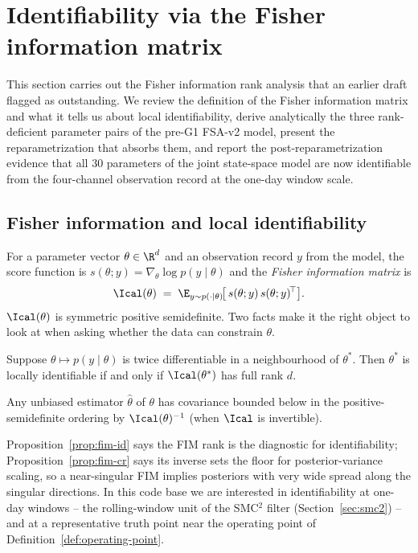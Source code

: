\section{Identifiability via the Fisher information matrix}\label{sec:fim}

This section carries out the Fisher information rank analysis that an
earlier draft flagged as outstanding. We review the definition of the
Fisher information matrix and what it tells us about local
identifiability, derive analytically the three rank-deficient parameter
pairs of the pre-G1 FSA-v2 model, present the reparametrization that
absorbs them, and report the post-reparametrization evidence that all
$30$ parameters of the joint state-space model are now identifiable
from the four-channel observation record at the one-day window scale.

\subsection{Fisher information and local identifiability}

For a parameter vector $\theta \in \R^d$ and an observation record
$y$ from the model, the score function is
$s(\theta;y) = \nabla_\theta \log p(y\mid\theta)$ and the
\emph{Fisher information matrix} is
\begin{equation}
  \Ical(\theta) \;=\;
    \E_{y \sim p(\cdot\mid\theta)}\!\bigl[\,s(\theta;y)\,s(\theta;y)^{\!\top}\bigr].
  \label{eq:fim-def}
\end{equation}
$\Ical(\theta)$ is symmetric positive semidefinite. Two facts make it
the right object to look at when asking whether the data can constrain
$\theta$.

\begin{proposition}\label{prop:fim-id}
Suppose $\theta \mapsto p(y\mid\theta)$ is twice differentiable in a
neighbourhood of $\theta^*$. Then $\theta^*$ is locally identifiable if
and only if $\Ical(\theta^*)$ has full rank $d$.
\end{proposition}

\begin{proposition}\label{prop:fim-cr}
Any unbiased estimator $\hat\theta$ of $\theta$ has covariance bounded
below in the positive-semidefinite ordering by
$\Ical(\theta)^{-1}$ (when $\Ical$ is invertible).
\end{proposition}

Proposition~\ref{prop:fim-id} says the FIM rank is the diagnostic for
identifiability; Proposition~\ref{prop:fim-cr} says its inverse sets
the floor for posterior-variance scaling, so a near-singular FIM
implies posteriors with very wide spread along the singular directions.
In this code base we are interested in identifiability at one-day
windows -- the rolling-window unit of the SMC${}^2$ filter
(Section~\ref{sec:smc2}) -- and at a representative truth point near
the operating point of Definition~\ref{def:operating-point}.

